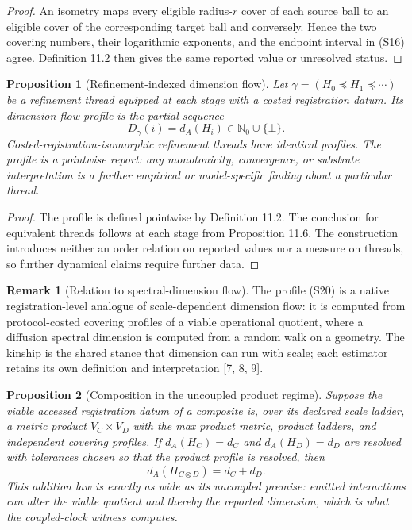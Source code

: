 \documentclass[11pt]{article}
\newtheorem{proposition}{Proposition}
\theoremstyle{definition}
\newtheorem{remark}{Remark}
\begin{document}
\begin{proof}
An isometry maps every eligible radius-$r$ cover of each source ball to an eligible cover of the corresponding target ball and conversely. Hence the two covering numbers, their logarithmic exponents, and the endpoint interval in (S16) agree. Definition 11.2 then gives the same reported value or unresolved status.
\end{proof}

\begin{proposition}[Refinement-indexed dimension flow]
Let $\gamma = (H_0 \preceq H_1 \preceq \cdots)$ be a refinement thread equipped at each stage with a costed registration datum. Its dimension-flow profile is the partial sequence
\begin{equation}
D_\gamma(i) = d_A(H_i) \in \mathbb{N}_0 \cup \{\bot\}. \tag{S20}
\end{equation}
Costed-registration-isomorphic refinement threads have identical profiles. The profile is a pointwise report: any monotonicity, convergence, or substrate interpretation is a further empirical or model-specific finding about a particular thread.
\end{proposition}

\begin{proof}
The profile is defined pointwise by Definition 11.2. The conclusion for equivalent threads follows at each stage from Proposition 11.6. The construction introduces neither an order relation on reported values nor a measure on threads, so further dynamical claims require further data.
\end{proof}

\begin{remark}[Relation to spectral-dimension flow]
The profile (S20) is a native registration-level analogue of scale-dependent dimension flow: it is computed from protocol-costed covering profiles of a viable operational quotient, where a diffusion spectral dimension is computed from a random walk on a geometry. The kinship is the shared stance that dimension can run with scale; each estimator retains its own definition and interpretation [7, 8, 9].
\end{remark}

\begin{proposition}[Composition in the uncoupled product regime]
Suppose the viable accessed registration datum of a composite is, over its declared scale ladder, a metric product $V_C \times V_D$ with the max product metric, product ladders, and independent covering profiles. If $d_A(H_C) = d_C$ and $d_A(H_D) = d_D$ are resolved with tolerances chosen so that the product profile is resolved, then
\begin{equation}
d_A(H_{C \otimes D}) = d_C + d_D. \tag{S21}
\end{equation}
This addition law is exactly as wide as its uncoupled premise: emitted interactions can alter the viable quotient and thereby the reported dimension, which is what the coupled-clock witness computes.
\end{proposition}
\end{document}
